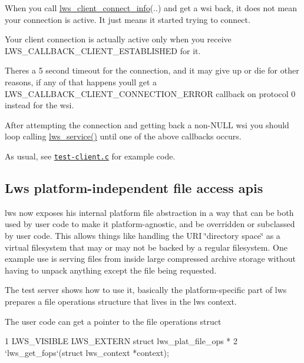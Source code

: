 When you call {\ttfamily \hyperlink{structlws__client__connect__info}{lws\+\_\+client\+\_\+connect\+\_\+info}(..)} and get a {\ttfamily wsi} back, it does not mean your connection is active. It just means it started trying to connect.

Your client connection is actually active only when you receive {\ttfamily L\+W\+S\+\_\+\+C\+A\+L\+L\+B\+A\+C\+K\+\_\+\+C\+L\+I\+E\+N\+T\+\_\+\+E\+S\+T\+A\+B\+L\+I\+S\+H\+ED} for it.

There\textquotesingle{}s a 5 second timeout for the connection, and it may give up or die for other reasons, if any of that happens you\textquotesingle{}ll get a {\ttfamily L\+W\+S\+\_\+\+C\+A\+L\+L\+B\+A\+C\+K\+\_\+\+C\+L\+I\+E\+N\+T\+\_\+\+C\+O\+N\+N\+E\+C\+T\+I\+O\+N\+\_\+\+E\+R\+R\+OR} callback on protocol 0 instead for the {\ttfamily wsi}.

After attempting the connection and getting back a non-\/{\ttfamily N\+U\+LL} {\ttfamily wsi} you should loop calling {\ttfamily \hyperlink{group__service_gaf95bd0c663d6516a0c80047d9b1167a8}{lws\+\_\+service()}} until one of the above callbacks occurs.

As usual, see \href{test-server/test-client.c}{\tt test-\/client.\+c} for example code.

\subsection*{Lws platform-\/independent file access apis }

lws now exposes his internal platform file abstraction in a way that can be both used by user code to make it platform-\/agnostic, and be overridden or subclassed by user code. This allows things like handling the U\+RI \char`\"{}directory
space\char`\"{} as a virtual filesystem that may or may not be backed by a regular filesystem. One example use is serving files from inside large compressed archive storage without having to unpack anything except the file being requested.

The test server shows how to use it, basically the platform-\/specific part of lws prepares a file operations structure that lives in the lws context.

The user code can get a pointer to the file operations struct


\begin{DoxyCode}
1 LWS\_VISIBLE LWS\_EXTERN struct lws\_plat\_file\_ops *
2         `lws\_get\_fops`(struct lws\_context *context);
\end{DoxyCode}


